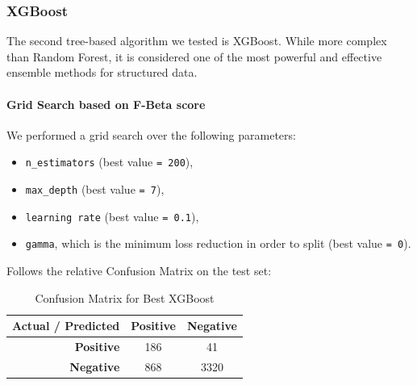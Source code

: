 \documentclass{article}
\begin{document}
\subsubsection{XGBoost}
The second tree-based algorithm we tested is XGBoost. While more complex than Random Forest, it is considered one of the most powerful and effective ensemble methods for structured data.
\paragraph{Grid Search based on F-Beta score}\mbox{}\newline
We performed a grid search over the following parameters:
\begin{itemize}
    \item \texttt{n\_estimators} (best value \texttt{= 200}),
    \item \texttt{max\_depth} (best value \texttt{= 7}),
    \item \texttt{learning rate} (best value \texttt{= 0.1}),
    \item \texttt{gamma}, which is the minimum loss reduction in order to split  (best value \texttt{= 0}).
\end{itemize}
Follows the relative Confusion Matrix on the test set:
\begin{table}[h!]
\centering
\caption{Confusion Matrix for Best XGBoost}
\label{tab:confusion_matrix5}
\begin{tabular}{r|cc}
\toprule
\textbf{Actual / Predicted} & \textbf{Positive} & \textbf{Negative} \\
\midrule
\textbf{Positive} & 186 & 41 \\
\textbf{Negative} & 868 & 3320 \\
\bottomrule
\end{tabular}
\end{table}
\end{document}
